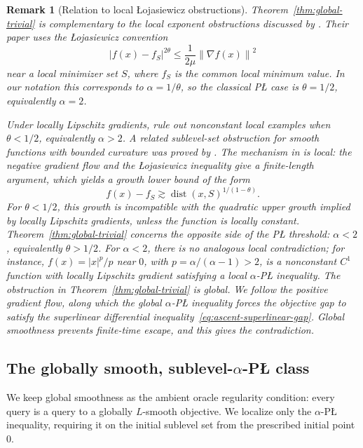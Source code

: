 \documentclass[11pt]{article}
\newtheorem{remark}[theorem]{Remark}
\newcommand{\norm}[1]{\left\lVert #1\right\rVert}
\begin{document}
\begin{remark}[Relation to local \L{}ojasiewicz obstructions]
\label{rem:rebjock-boumal-comparison}
Theorem~\ref{thm:global-trivial} is complementary to the local exponent obstructions discussed by
\citet[Remark~2.21]{RebjockBoumal2024}. Their paper uses the \L{}ojasiewicz convention
\[
|f(x)-f_S|^{2\theta}\le \frac{1}{2\mu}\norm{\nabla f(x)}^2
\]
near a local minimizer set \(S\), where \(f_S\) is the common local minimum value. In our notation this corresponds to
\(\alpha=1/\theta\), so the classical P\L{} case is \(\theta=1/2\), equivalently \(\alpha=2\).

Under locally Lipschitz gradients, \citet[Remark~2.21]{RebjockBoumal2024} rule out nonconstant local examples when
\(\theta<1/2\), equivalently \(\alpha>2\). A related sublevel-set obstruction for smooth functions with bounded
curvature was proved by \citet[Theorem~4]{AbbaszadehpeivastiDeKlerkZamani2023}. The mechanism in
\citet{RebjockBoumal2024} is local: the negative gradient flow and the
\L{}ojasiewicz inequality give a finite-length argument, which yields a growth lower bound of the form
\[
f(x)-f_S \gtrsim \operatorname{dist}(x,S)^{1/(1-\theta)}.
\]
For \(\theta<1/2\), this growth is incompatible with the quadratic upper growth implied by locally Lipschitz
gradients, unless the function is locally constant. Theorem~\ref{thm:global-trivial} concerns the opposite side of the P\L{} threshold: \(\alpha<2\), equivalently
\(\theta>1/2\). For \(\alpha<2\), there is no analogous local contradiction; for instance,
\(f(x)=|x|^p/p\) near \(0\), with \(p=\alpha/(\alpha-1)>2\), is a nonconstant \(C^1\) function with locally Lipschitz gradient satisfying a local
\(\alpha\)-P\L{} inequality. The obstruction in Theorem~\ref{thm:global-trivial} is global. We follow the \emph{positive}
gradient flow, along which the global \(\alpha\)-P\L{} inequality forces the objective gap to satisfy the superlinear
differential inequality~\eqref{eq:ascent-superlinear-gap}. Global smoothness prevents finite-time escape, and this gives the contradiction.
\end{remark}


\subsection{\texorpdfstring{The globally smooth, sublevel-$\alpha$-P\L{} class}{The globally smooth, sublevel-alpha-PL class}}

We keep
global smoothness as the ambient oracle regularity condition: every query is a query to a globally \(L\)-smooth
objective. We localize only the $\alpha$-P\L{} inequality, requiring it on the initial sublevel set from the prescribed
initial point \(0\).
\end{document}

